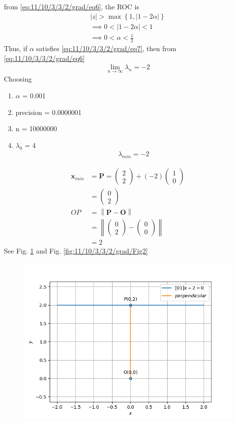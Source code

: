 \documentclass[12pt]{article}
\providecommand{\brak}[1]{\ensuremath{\left(#1\right)}}
\providecommand{\cbrak}[1]{\ensuremath{\left\{#1\right\}}}
\providecommand{\norm}[1]{\left\lVert#1\right\rVert}
\providecommand{\abs}[1]{\left\vert#1\right\vert}
\newcommand{\myvec}[1]{\ensuremath{\begin{pmatrix}#1\end{pmatrix}}}
\let\vec\mathbf
\begin{document}
from \eqref{eq:11/10/3/3/2/grad/eq6}, the ROC is
\begin{align}
	\abs{z}>\max\cbrak{{1,\abs{1-2\alpha}}}\\
	\implies 0<\abs{1-2\alpha}<1\\
	\label{eq:11/10/3/3/2/grad/eq7}
	\implies 0<\alpha<\frac{1}{2}
\end{align}
Thus, if $\alpha$ satisfies \eqref{eq:11/10/3/3/2/grad/eq7}, then from \eqref{eq:11/10/3/3/2/grad/eq6}
\begin{align}
	\lim_{n\to\infty} \lambda_{n} = -2
\end{align}
Choosing
\begin{enumerate}
\item $\alpha$ = 0.001
\item precision = 0.0000001
\item n = 10000000
\item $\lambda_0$ = 4
\begin{align}
	\lambda_{min} = -2
\end{align}
\end{enumerate}
\begin{align}
	\vec{x}_{min} &= \vec{P} = \myvec{2\\2}+\brak{-2}\myvec{1\\0}\\
	&= \myvec{0\\2}\\
	OP &= \norm{\vec{P}-\vec{O}}\\
	&= \norm{\myvec{0\\2}-\myvec{0\\0}}\\
	&= 2
\end{align}
See Fig. \ref{fig:11/10/3/3/2/grad/Fig1} and Fig. \ref{fig:11/10/3/3/2/grad/Fig2}
\begin{figure}[!h]
	\begin{center} 
	    \includegraphics[width=\columnwidth]{11/10/3/3/2/grad/figs/opt1}
	\end{center}
\caption{}
\label{fig:11/10/3/3/2/grad/Fig1}
\end{figure}
\end{document}
